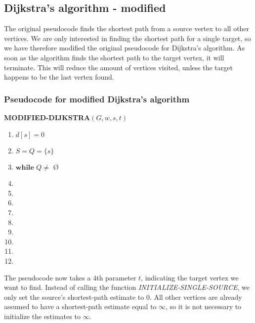 \documentclass[11pt]{article}
\begin{document}
\subsection{Dijkstra's algorithm - modified}
\noindent The original pseudocode finds the shortest path from a source vertex to all other vertices. We are only interested in finding the shortest path for a single target, so we have therefore modified the original pseudocode for Dijkstra's algorithm. As soon as the algorithm finds the shortest path to the target vertex, it will terminate. This will reduce the amount of vertices visited, unless the target happens to be the last vertex found.\\
\subsubsection{Pseudocode for modified Dijkstra's algorithm}
\hspace{4ex}\textbf{MODIFIED-DIJKSTRA$(G, w, s, t)$}
\begin{enumerate}
\setlength\itemsep{0em}
\item $d[s] = 0$
\item $S = Q = \{s\}$
\item $\textbf{while } Q \neq  $ \O
\item {}
\item {}
\item \tab{}
\item {}
\item \tab{}
\item \tab{}\tab{}
\item \tab{}\tab{}
\item \tab{}\tab{}
\item \tab{}\tab{}
\end{enumerate}

\noindent The pseudocode now takes a 4th parameter $t$, indicating the target vertex we want to find. Instead of calling the function \textit{INITIALIZE-SINGLE-SOURCE}, we only set the source's shortest-path estimate to 0. All other vertices are already assumed to have a shortest-path estimate equal to $\infty$, so it is not necessary to initialize the estimates to $\infty$.\\
\end{document}

